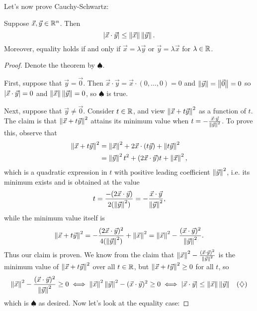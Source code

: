 \documentclass[main.tex]{subfiles}
\begin{document}
Let's now prove Cauchy-Schwartz:
\begin{theorem}
    Suppose $\vec{x}, \vec{y}\in \mathbb R^n$. Then
    \[\left\lvert \vec{x}\cdot \vec{y} \right\rvert\le \left\lVert \vec{x} \right\rVert \left\lVert \vec{y} \right\rVert.\]
    Moreover, equality holds if and only if $\vec{x} = \lambda\vec{y}$ or $\vec{y} = \lambda\vec{x}$ for $\lambda\in \mathbb R$.
\end{theorem}

\begin{proof}
    Denote the theorem by $\spadesuit$.
    
    First, suppose that $\vec{y} = \vec{0}$. Then $\vec{x}\cdot \vec{y} = \vec{x}\cdot (0, \ldots , 0) = 0$ and $\left\lVert \vec{y} \right\rVert = \left\lVert \vec{0} \right\rVert = 0$ so $\left\lvert \vec{x}\cdot \vec{y} \right\rvert = 0$ and $\left\lVert \vec{x} \right\rVert \left\lVert \vec{y} \right\rVert = 0$, so $\spadesuit$ is true.

    Next, suppose that $\vec{y}\neq \vec{0}$. Consider $t\in \mathbb R$, and view $\left\lVert \vec{x} + t\vec{y} \right\rVert^2$ as a function of $t$. The claim is that $\left\lVert \vec{x} + t\vec{y} \right\rVert^2$ attains its minimum value when $t = -\frac{\vec{x}\cdot \vec{y}}{\left\lVert \vec{y} \right\rVert^2}$. To prove this, observe that
    \begin{align*}
        \left\lVert \vec{x} + t\vec{y} \right\rVert^2&= \left\lVert \vec{x} \right\rVert^2 + 2\vec{x} \cdot (t\vec{y}) + \left\lVert t\vec{y} \right\rVert^2 \\
        &= \left\lVert \vec{y} \right\rVert^2t^2 + (2\vec{x} \cdot \vec{y})t + \left\lVert \vec{x} \right\rVert^2,
    \end{align*}
    which is a quadratic expression in $t$ with positive leading coefficient $\left\lVert \vec{y} \right\rVert^2$, i.e. its minimum exists and is obtained at the value
    \[t = \frac{-(2\vec{x}\cdot \vec{y})}{2(\left\lVert \vec{y} \right\rVert^2)} = -\frac{\vec{x}\cdot \vec{y}}{\left\lVert \vec{y} \right\rVert^2},\]
    while the minimum value itself is 
    \[\left\lVert \vec{x} + t\vec{y} \right\rVert^2 = -\frac{(2\vec{x}\cdot \vec{y})^2}{4(\left\lVert \vec{y} \right\rVert^2)} + \left\lVert \vec{x} \right\rVert^2 = \left\lVert \vec{x} \right\rVert^2 - \frac{(\vec{x}\cdot \vec{y})^2}{\left\lVert \vec{y} \right\rVert^2}.\]
    Thus our claim is proven. We know from the claim that $\left\lVert \vec{x} \right\rVert^2 - \frac{(\vec{x}\cdot \vec{y})^2}{\left\lVert \vec{y} \right\rVert^2}$ is the minimum value of $\left\lVert \vec{x} + t\vec{y} \right\rVert^2$ over all $t\in \mathbb R$, but $\left\lVert \vec{x} + t\vec{y} \right\rVert^2\ge 0$ for all $t$, so 
    \begin{align*}
        \left\lVert \vec{x} \right\rVert^2 - \frac{(\vec{x}\cdot \vec{y})^2}{\left\lVert \vec{y} \right\rVert^2}\ge 0\iff \left\lVert \vec{x} \right\rVert^2 \left\lVert \vec{y} \right\rVert^2 - (\vec{x}\cdot \vec{y})^2 \ge 0 \iff \left\lvert \vec{x}\cdot \vec{y} \right\rvert\le \left\lVert \vec{x} \right\rVert \left\lVert \vec{y} \right\rVert && (\diamondsuit)
    \end{align*}
    which is $\spadesuit$ as desired. Now let's look at the equality case:


\end{proof}
\end{document}

